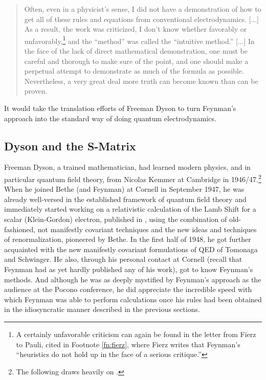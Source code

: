 \documentclass[12pt]{article}
\begin{document}
\begin{quote}
Often, even in a physicist's sense, I did not have a demonstration of how to get all of these rules and equations from conventional electrodynamics. [...] As a result, the work was criticized, I don't know whether favorably or unfavorably,\footnote{A certainly unfavorable criticism can again be found in the letter from Fierz to Pauli, cited in Footnote \ref{fn:fierz}, where Fierz writes that Feynman's ``heuristics do not hold up in the face of a serious critique.''} and the ``method'' was called the ``intuitive method.'' [...] In the face of the lack of direct mathematical demonstration, one must be careful and thorough to make sure of the point, and one should make a perpetual attempt to demonstrate as much of the formula as possible. Nevertheless, a very great deal more truth can become known than can be proven.
\end{quote}

It would take the translation efforts of Freeman Dyson to turn Feynman's approach into the standard way of doing quantum electrodynamics.

\subsection{Dyson and the S-Matrix}

Freeman Dyson, a trained mathematician, had learned modern physics, and in particular quantum field theory, from Nicolas Kemmer at Cambridge in 1946/47.\footnote{The following draws heavily on \citep[ch. 9]{schweber_1994_qed}.}  When he joined Bethe (and Feynman) at Cornell in September 1947, he was already well-versed in the established framework of quantum field theory and immediately started working on a relativistic calculation of the Lamb Shift for a scalar (Klein-Gordon) electron, published in \citep{dyson_1948_the-electromagnetic}, using the combination of old-fashioned, not manifestly covariant techniques and the new ideas and techniques of renormalization, pioneered by Bethe. In the first half of 1948, he got further acquainted with the new manifestly covariant formulations of QED of Tomonaga and Schwinger. He also, through his personal contact at Cornell (recall that Feynman had as yet hardly published any of his work), got to know Feynman's methods. And although he was as deeply mystified by Feynman's approach as the audience at the Pocono conference, he did appreciate the incredible speed with which Feynman was able to perform calculations once his rules had been obtained in the idiosyncratic manner described in the previous sections.
\end{document}
